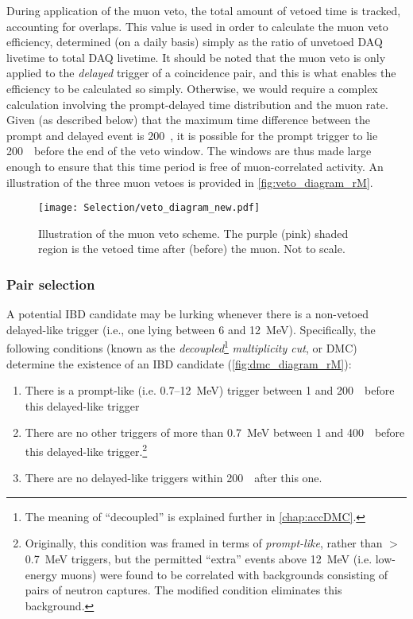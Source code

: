 \documentclass[../thesis.tex]{subfiles}
\begin{document}
During application of the muon veto, the total amount of vetoed time is tracked, accounting for overlaps. This value is used in order to calculate the muon veto efficiency, determined (on a daily basis) simply as the ratio of unvetoed DAQ livetime to total DAQ livetime. It should be noted that the muon veto is only applied to the \emph{delayed} trigger of a coincidence pair, and this is what enables the efficiency to be calculated so simply. Otherwise, we would require a complex calculation involving the prompt-delayed time distribution and the muon rate. Given (as described below) that the maximum time difference between the prompt and delayed event is 200~\us, it is possible for the prompt trigger to lie 200~\us\ before the end of the veto window. The windows are thus made large enough to ensure that this time period is free of muon-correlated activity. An illustration of the three muon vetoes is provided in \autoref{fig:veto_diagram_rM}.

\begin{figure}[h!]
  \texttt{[image: Selection/veto\_diagram\_new.pdf]}
  \caption{Illustration of the muon veto scheme. The purple (pink) shaded region is the vetoed time after (before) the muon. Not to scale.}
  \label{fig:veto_diagram_rM}
\end{figure}

\subsubsection{Pair selection}
\label{sec:pairSel}

A potential IBD candidate may be lurking whenever there is a non-vetoed delayed-like trigger (i.e., one lying between 6 and 12~MeV). Specifically, the following conditions (known as the \emph{decoupled}\footnote{The meaning of ``decoupled'' is explained further in \autoref{chap:accDMC}.} \emph{multiplicity cut}, or DMC) determine the existence of an IBD candidate (\autoref{fig:dmc_diagram_rM}):

\begin{enumerate}
\item There is a prompt-like (i.e. 0.7--12~MeV) trigger between 1 and 200~\us\ before this delayed-like trigger
\item There are no other triggers of more than 0.7~MeV between 1 and 400~\us\ before this delayed-like trigger.\footnote{Originally, this condition was framed in terms of \emph{prompt-like}, rather than $>$0.7~MeV triggers, but the permitted ``extra'' events above 12~MeV (i.e. low-energy muons) were found to be correlated with backgrounds consisting of pairs of neutron captures. The modified condition eliminates this background.}
\item There are no delayed-like triggers within 200~\us\ after this one.
\end{enumerate}
\end{document}
